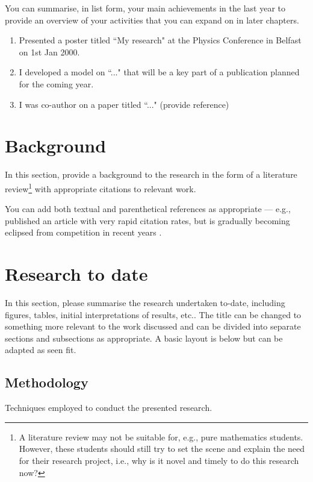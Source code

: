 \documentclass[11pt]{report}
\begin{document}
You can summarise, in list form, your main achievements in the last year to provide an overview of your activities that you can expand on in later chapters.

\begin{enumerate}
	\item Presented a poster titled ``My research" at the Physics Conference in Belfast on 1st Jan 2000.
	\item I developed a model on ``..." that will be a key part of a publication planned for the coming year.
	\item I was co-author on a paper titled ``..." (provide reference)
\end{enumerate}

\chapter{Background}

In this section, provide a background to the research in the form of a literature review\footnote{A literature review may not be suitable for, e.g., pure mathematics students. However, these students should still try to set the scene and explain the need for their research project, i.e., why is it novel and timely to do this research now?} with appropriate citations to relevant work.

You can add both textual and parenthetical references as appropriate --- e.g., \citet{2012PhLB..716....1A} published an article with very rapid citation rates, but is gradually becoming eclipsed from competition in recent years \citep[e.g.,][to name but a few]{2018Natur.556...43C, 2018PhRvD..98c0001T, 2019ApJ...873..111I}.

\chapter{Research to date}
In this section, please summarise the research undertaken to-date, including figures, tables, initial interpretations of results, etc..  The title can be changed to something more relevant to the work discussed and can be divided into separate sections and subsections as appropriate.  A basic layout is below but can be adapted as seen fit.

\section{Methodology}

Techniques employed to conduct the presented research.
\end{document}
